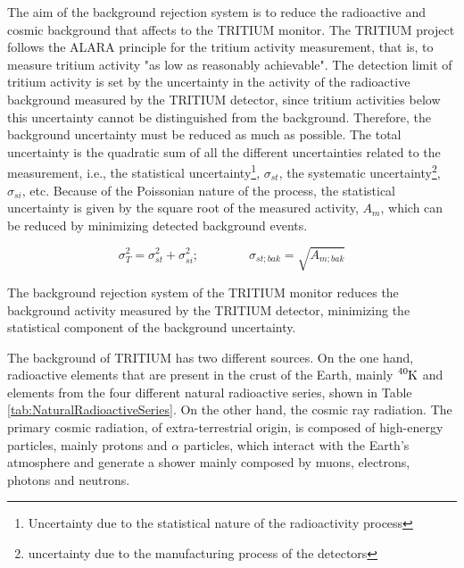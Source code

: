 The aim of the background rejection system is to reduce the radioactive and cosmic background that affects to the TRITIUM monitor. The TRITIUM project follows the ALARA principle for the tritium activity measurement, that is, to measure tritium activity "as low as reasonably achievable". The detection limit of tritium activity is set by the uncertainty in the activity of the radioactive background measured by the TRITIUM detector, since tritium activities below this uncertainty cannot be distinguished from the background. Therefore, the background uncertainty must be reduced as much as possible. The total uncertainty is the quadratic sum of all the different uncertainties related to the measurement, i.e., the statistical uncertainty\footnote{Uncertainty due to the statistical nature of the radioactivity process}, $\sigma_{st}$, the systematic uncertainty\footnote{uncertainty due to the manufacturing process of the detectors}, $\sigma_{si}$, etc. Because of the Poissonian nature of the process, the statistical uncertainty is given by the square root of the measured activity, $A_{m}$, which can be reduced by minimizing detected background events.

\begin{equation}
\sigma_{T}^2 = \sigma_{st}^2 +\sigma_{si}^2; \qquad \qquad \sigma_{st;bak} = \sqrt{A_{m;bak}}
\label{eq:SquareSumUncerainty}
\end{equation} 

The background rejection system of the TRITIUM monitor reduces the background activity measured by the TRITIUM detector, minimizing the statistical component of the background uncertainty.

The background of TRITIUM has two different sources. On the one hand, radioactive elements that are present in the crust of the Earth, mainly $\ce{^{40}K}$ and elements from the four different natural radioactive series, shown in Table \ref{tab:NaturalRadioactiveSeries}. On the other hand, the cosmic ray radiation. The primary cosmic radiation, of extra-terrestrial origin, is composed of high-energy particles, mainly protons and $\alpha$ particles, which interact with the Earth's atmosphere and generate a shower mainly composed by muons, electrons, photons and neutrons.

